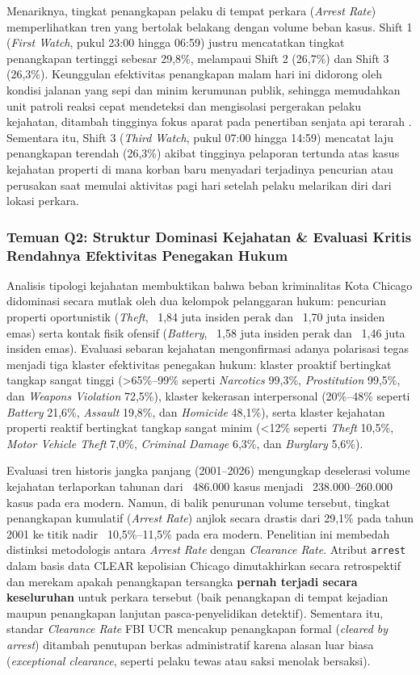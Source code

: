 \documentclass[11pt,a4paper]{article}
\begin{document}
Menariknya, tingkat penangkapan pelaku di tempat perkara (\textit{Arrest Rate}) memperlihatkan tren yang bertolak belakang dengan volume beban kasus. Shift 1 (\textit{First Watch}, pukul 23:00 hingga 06:59) justru mencatatkan tingkat penangkapan tertinggi sebesar 29,8\%, melampaui Shift 2 (26,7\%) dan Shift 3 (26,3\%). Keunggulan efektivitas penangkapan malam hari ini didorong oleh kondisi jalanan yang sepi dan minim kerumunan publik, sehingga memudahkan unit patroli reaksi cepat mendeteksi dan mengisolasi pergerakan pelaku kejahatan, ditambah tingginya fokus aparat pada penertiban senjata api terarah \cite{towers2018}. Sementara itu, Shift 3 (\textit{Third Watch}, pukul 07:00 hingga 14:59) mencatat laju penangkapan terendah (26,3\%) akibat tingginya pelaporan tertunda atas kasus kejahatan properti di mana korban baru menyadari terjadinya pencurian atau perusakan saat memulai aktivitas pagi hari setelah pelaku melarikan diri dari lokasi perkara.

\subsubsection{Temuan Q2: Struktur Dominasi Kejahatan \& Evaluasi Kritis Rendahnya Efektivitas Penegakan Hukum}
Analisis tipologi kejahatan membuktikan bahwa beban kriminalitas Kota Chicago didominasi secara mutlak oleh dua kelompok pelanggaran hukum: pencurian properti oportunistik (\textit{Theft}, ~1,84 juta insiden perak dan ~1,70 juta insiden emas) serta kontak fisik ofensif (\textit{Battery}, ~1,58 juta insiden perak dan ~1,46 juta insiden emas). Evaluasi sebaran kejahatan mengonfirmasi adanya polarisasi tegas menjadi tiga klaster efektivitas penegakan hukum: klaster proaktif bertingkat tangkap sangat tinggi (>65\%--99\% seperti \textit{Narcotics} 99,3\%, \textit{Prostitution} 99,5\%, dan \textit{Weapons Violation} 72,5\%), klaster kekerasan interpersonal (20\%--48\% seperti \textit{Battery} 21,6\%, \textit{Assault} 19,8\%, dan \textit{Homicide} 48,1\%), serta klaster kejahatan properti reaktif bertingkat tangkap sangat minim (<12\% seperti \textit{Theft} 10,5\%, \textit{Motor Vehicle Theft} 7,0\%, \textit{Criminal Damage} 6,3\%, dan \textit{Burglary} 5,6\%).

Evaluasi tren historis jangka panjang (2001--2026) mengungkap deselerasi volume kejahatan terlaporkan tahunan dari ~486.000 kasus menjadi ~238.000--260.000 kasus pada era modern. Namun, di balik penurunan volume tersebut, tingkat penangkapan kumulatif (\textit{Arrest Rate}) anjlok secara drastis dari 29,1\% pada tahun 2001 ke titik nadir ~10,5\%--11,5\% pada era modern. Penelitian ini membedah distinksi metodologis antara \textit{Arrest Rate} dengan \textit{Clearance Rate}. Atribut \texttt{arrest} dalam basis data CLEAR kepolisian Chicago dimutakhirkan secara retrospektif dan merekam apakah penangkapan tersangka \textbf{pernah terjadi secara keseluruhan} untuk perkara tersebut (baik penangkapan di tempat kejadian maupun penangkapan lanjutan pasca-penyelidikan detektif). Sementara itu, standar \textit{Clearance Rate} FBI UCR mencakup penangkapan formal (\textit{cleared by arrest}) ditambah penutupan berkas administratif karena alasan luar biasa (\textit{exceptional clearance}, seperti pelaku tewas atau saksi menolak bersaksi).
\end{document}

